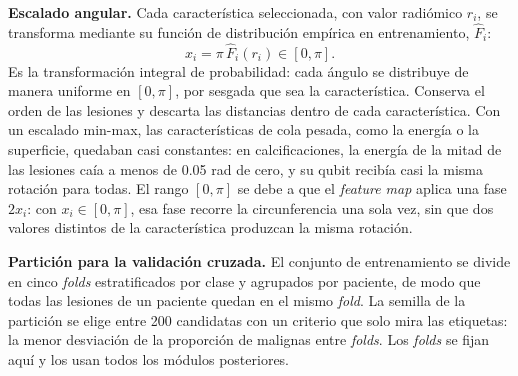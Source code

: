 \textbf{Escalado angular.} Cada característica seleccionada, con valor radiómico $r_i$, se transforma
mediante su función de distribución empírica en entrenamiento, $\hat F_i$:
\begin{equation}
  x_i = \pi\,\hat F_i(r_i) \in [0,\pi].
  \label{eq:quantile_scaling}
\end{equation}
Es la transformación integral de probabilidad: cada ángulo se distribuye de manera uniforme en
$[0,\pi]$, por sesgada que sea la característica. Conserva el orden de las lesiones y descarta las
distancias dentro de cada característica. Con un escalado min-max, las características de cola
pesada, como la energía o la superficie, quedaban casi constantes: en calcificaciones, la energía de
la mitad de las lesiones caía a menos de 0.05 rad de cero, y su qubit recibía casi la misma rotación
para todas. El rango $[0,\pi]$ se debe a que el
\textit{feature map} aplica una fase $2x_i$: con $x_i\in[0,\pi]$, esa fase recorre la circunferencia
una sola vez, sin que dos valores distintos de la característica produzcan la misma rotación.

\textbf{Partición para la validación cruzada.} El conjunto de entrenamiento se divide en cinco
\textit{folds} estratificados por clase y agrupados por paciente, de modo que todas las lesiones de
un paciente quedan en el mismo \textit{fold}. La semilla de la partición se elige entre 200
candidatas con un criterio que solo mira las etiquetas: la menor desviación de la proporción de
malignas entre \textit{folds}. Los \textit{folds} se fijan aquí y los usan todos los módulos
posteriores.

